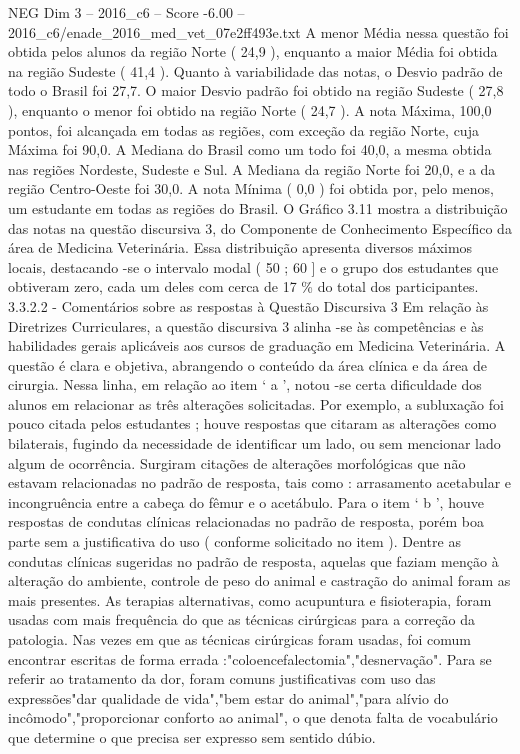 \begin{textsample}{NEG Dim 3 – 2016\_c6 – Score -6.00 – 2016\_c6/enade\_2016\_med\_vet\_07e2ff493e.txt}
A menor Média nessa questão foi obtida pelos alunos da região Norte ( 24,9 ), enquanto a maior Média foi obtida na região Sudeste ( 41,4 ).
Quanto à variabilidade das notas, o Desvio padrão de todo o Brasil foi 27,7.
O maior Desvio padrão foi obtido na região Sudeste ( 27,8 ), enquanto o menor foi obtido na região Norte ( 24,7 ).
A nota Máxima, 100,0 pontos, foi alcançada em todas as regiões, com exceção da região Norte, cuja Máxima foi 90,0.
A Mediana do Brasil como um todo foi 40,0, a mesma obtida nas regiões Nordeste, Sudeste e Sul.
A Mediana da região Norte foi 20,0, e a da região Centro-Oeste foi 30,0.
A nota Mínima ( 0,0 ) foi obtida por, pelo menos, um estudante em todas as regiões do Brasil.
O Gráfico 3.11 mostra a distribuição das notas na questão discursiva 3, do Componente de Conhecimento Específico da área de Medicina Veterinária.
Essa distribuição apresenta diversos máximos locais, destacando -se o intervalo modal ( 50 ; 60 ] e o grupo dos estudantes que obtiveram zero, cada um deles com cerca de 17 \% do total dos participantes. 3.3.2.2 - Comentários sobre as respostas à Questão Discursiva 3 Em relação às Diretrizes Curriculares, a questão discursiva 3 alinha -se às competências e às habilidades gerais aplicáveis aos cursos de graduação em Medicina Veterinária.
A questão é clara e objetiva, abrangendo o conteúdo da área clínica e da área de cirurgia.
Nessa linha, em relação ao item ‘ a ’, notou -se certa dificuldade dos alunos em relacionar as três alterações solicitadas.
Por exemplo, a subluxação foi pouco citada pelos estudantes ; houve respostas que citaram as alterações como bilaterais, fugindo da necessidade de identificar um lado, ou sem mencionar lado algum de ocorrência.
Surgiram citações de alterações morfológicas que não estavam relacionadas no padrão de resposta, tais como : arrasamento acetabular e incongruência entre a cabeça do fêmur e o acetábulo.
Para o item ‘ b ’, houve respostas de condutas clínicas relacionadas no padrão de resposta, porém boa parte sem a justificativa do uso ( conforme solicitado no item ).
Dentre as condutas clínicas sugeridas no padrão de resposta, aquelas que faziam menção à alteração do ambiente, controle de peso do animal e castração do animal foram as mais presentes.
As terapias alternativas, como acupuntura e fisioterapia, foram usadas com mais frequência do que as técnicas cirúrgicas para a correção da patologia.
Nas vezes em que as técnicas cirúrgicas foram usadas, foi comum encontrar escritas de forma errada :"coloencefalectomia","desnervação".
Para se referir ao tratamento da dor, foram comuns justificativas com uso das expressões"dar qualidade de vida","bem estar do animal","para alívio do incômodo","proporcionar conforto ao animal", o que denota falta de vocabulário que determine o que precisa ser expresso sem sentido dúbio.

\end{textsample}
